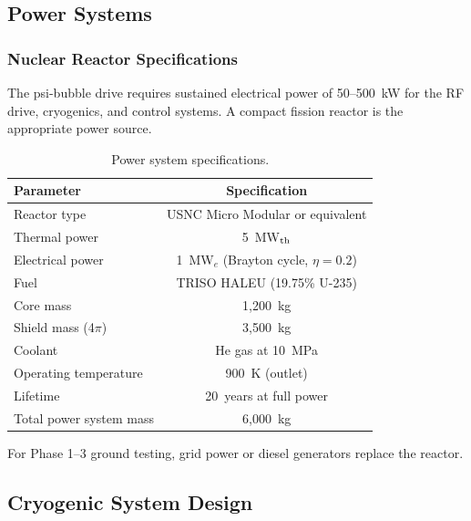 \documentclass[twocolumn,prl,superscriptaddress,nofootinbib,longbibliography,floatfix]{revtex4-2}
\begin{document}
\subsection{Power Systems}

\subsubsection{Nuclear Reactor Specifications}

The psi-bubble drive requires sustained electrical power of
50--500~kW for the RF drive, cryogenics, and control systems.  A
compact fission reactor is the appropriate power source.

\begin{table}[h]
\centering
\caption{Power system specifications.}
\label{tab:power}
\begin{ruledtabular}
\begin{tabular}{lc}
Parameter & Specification \\
\hline
Reactor type & USNC Micro Modular or equivalent \\
Thermal power & 5~MW$_{\rm th}$ \\
Electrical power & 1~MW$_e$ (Brayton cycle, $\eta = 0.2$) \\
Fuel & TRISO HALEU (19.75\% U-235) \\
Core mass & 1{,}200~kg \\
Shield mass (4$\pi$) & 3{,}500~kg \\
Coolant & He gas at 10~MPa \\
Operating temperature & 900~K (outlet) \\
Lifetime & 20~years at full power \\
Total power system mass & 6{,}000~kg \\
\end{tabular}
\end{ruledtabular}
\end{table}

For Phase 1--3 ground testing, grid power or diesel generators replace
the reactor.

\subsection{Cryogenic System Design}
\end{document}
